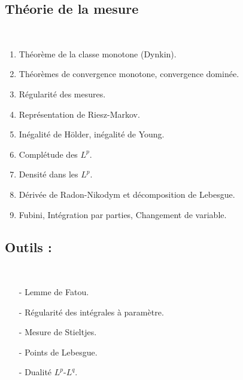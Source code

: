 \documentclass[12pt,a4paper]{article}
\begin{document}
\begin{center}
\section*{Théorie de la mesure} 
\end{center}
~\\
\begin{enumerate}
\item Théorème de la classe monotone (Dynkin). \\
\item Théorèmes de convergence monotone, convergence dominée. \\
\item Régularité des mesures. \\
\item Représentation de Riesz-Markov. \\
\item Inégalité de Hölder, inégalité de Young.  \\
\item Complétude des $L^p$. \\
\item Densité dans les $L^p$. \\
\item Dérivée de Radon-Nikodym et décomposition de Lebesgue. \\
\item Fubini, Intégration par parties, Changement de variable. \\
\end{enumerate}


\subsection*{Outils :} ~
\begin{itemize}
\item[-] Lemme de Fatou. \\
\item[-] Régularité des intégrales à paramètre. \\
\item[-] Mesure de Stieltjes. \\
\item[-] Points de Lebesgue. \\
\item[-] Dualité $L^p$-$L^q$. \\
\end{itemize}
\end{document}

